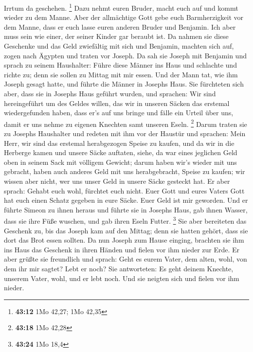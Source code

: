 Irrtum da geschehen. \footnote{\textbf{43:12} 1Mo 42,27; 1Mo 42,35}
 Dazu nehmt euren Bruder, macht euch auf und kommt wieder
zu dem Manne.  Aber der allmächtige Gott gebe euch
Barmherzigkeit vor dem Manne, dass er euch lasse euren anderen Bruder
und Benjamin. Ich aber muss sein wie einer, der seiner Kinder gar
beraubt ist.  Da nahmen sie diese Geschenke und das Geld
zwiefältig mit sich und Benjamin, machten sich auf, zogen nach Ägypten
und traten vor Joseph.  Da sah sie Joseph mit Benjamin
und sprach zu seinem Haushalter: Führe diese Männer ins Haus und
schlachte und richte zu; denn sie sollen zu Mittag mit mir essen.
 Und der Mann tat, wie ihm Joseph gesagt hatte, und
führte die Männer in Josephs Haus.  Sie fürchteten sich
aber, dass sie in Josephs Haus geführt wurden, und sprachen: Wir sind
hereingeführt um des Geldes willen, das wir in unseren Säcken das
erstemal wiedergefunden haben, dass er's auf uns bringe und fälle ein
Urteil über uns, damit er uns nehme zu eigenen Knechten samt unseren
Eseln. \footnote{\textbf{43:18} 1Mo 42,28}  Darum traten
sie zu Josephs Haushalter und redeten mit ihm vor der Haustür
 und sprachen: Mein Herr, wir sind das erstemal
herabgezogen Speise zu kaufen,  und da wir in die
Herberge kamen und unsere Säcke auftaten, siehe, da war eines jeglichen
Geld oben in seinem Sack mit völligem Gewicht; darum haben wir's wieder
mit uns gebracht,  haben auch anderes Geld mit uns
herabgebracht, Speise zu kaufen; wir wissen aber nicht, wer uns unser
Geld in unsere Säcke gesteckt hat.  Er aber sprach:
Gehabt euch wohl, fürchtet euch nicht. Euer Gott und eures Vaters Gott
hat euch einen Schatz gegeben in eure Säcke. Euer Geld ist mir geworden.
Und er führte Simeon zu ihnen heraus  und führte sie in
Josephs Haus, gab ihnen Wasser, dass sie ihre Füße wuschen, und gab
ihren Eseln Futter. \footnote{\textbf{43:24} 1Mo 18,4} 
Sie aber bereiteten das Geschenk zu, bis das Joseph kam auf den Mittag;
denn sie hatten gehört, dass sie dort das Brot essen sollten.
 Da nun Joseph zum Hause einging, brachten sie ihm ins
Haus das Geschenk in ihren Händen und fielen vor ihm nieder zur Erde.
 Er aber grüßte sie freundlich und sprach: Geht es eurem
Vater, dem alten, wohl, von dem ihr mir sagtet? Lebt er noch?
 Sie antworteten: Es geht deinem Knechte, unserem Vater,
wohl, und er lebt noch. Und sie neigten sich und fielen vor ihm nieder.
